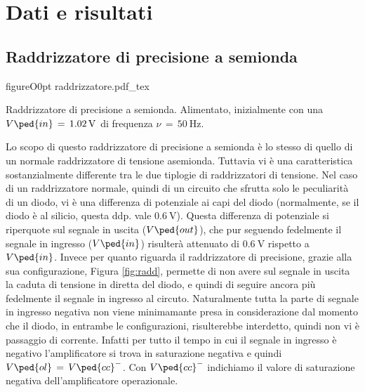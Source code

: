 \section*{Dati e risultati}

\subsection*{Raddrizzatore di precisione a semionda}

\begin{wrapfloat}{figure}{O}{0pt}
        \def\svgwidth{0.4\textwidth}
        {raddrizzatore.pdf_tex}
        \caption{Raddrizzatore di precisione a semionda. Alimentato, inizialmente con una $V\ped{in}\,=\,\SI{1.02}{\volt}$ di frequenza $\nu\,=\,\SI{50}{\hertz}$.}
        \label{fig:radd}
\end{wrapfloat}

Lo scopo di questo raddrizzatore di precisione a semionda è lo stesso di quello di un normale raddrizzatore di tensione asemionda. Tuttavia vi è una caratteristica sostanzialmente differente tra le due tiplogie di raddrizzatori di tensione. Nel caso di un raddrizzatore normale, quindi di un circuito che sfrutta solo le peculiarità di un diodo, vi è una differenza di potenziale ai capi del diodo (normalmente, se il diodo è al silicio, questa ddp. vale $\SI{0.6}{\volt}$). Questa differenza di potenziale si riperquote sul segnale in uscita ($V\ped{out}$), che pur seguendo fedelmente il segnale in ingresso ($V\ped{in}$) risulterà attenuato di $\SI{0.6}{\volt}$ rispetto a $V\ped{in}$.
Invece per quanto riguarda il raddrizzatore di precisione, grazie alla sua configurazione, Figura \ref{fig:radd}, permette di non avere sul segnale in uscita la caduta di tensione in diretta del diodo, e quindi di seguire ancora più fedelmente il segnale in ingresso al circuto.
Naturalmente tutta la parte di segnale in ingresso negativa non viene minimamante presa in considerazione dal momento che il diodo, in entrambe le configurazioni, risulterebbe interdetto, quindi non vi è passaggio di corrente. Infatti per tutto il tempo in cui il segnale in ingresso è negativo l'amplificatore si trova in saturazione negativa e quindi $V\ped{ol}\,=\,V\ped{cc}^-$. Con $V\ped{cc}^-$ indichiamo il valore di saturazione negativa dell'amplificatore operazionale.

